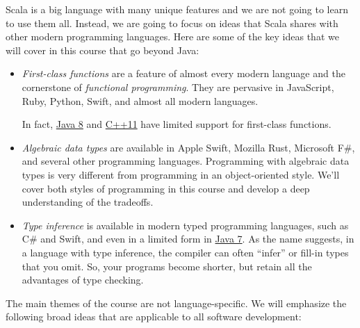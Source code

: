 \documentclass{book}
\begin{document}
Scala is a big language with many unique features and we are not going to learn
to use them all. Instead, we are going to focus on ideas that Scala shares with
other modern programming languages. Here are some of the key ideas that we will
cover in this course that go beyond Java:

\begin{itemize}

\item \emph{First-class functions} are a feature of almost every modern language
  and the cornerstone of \emph{functional programming}. They are pervasive in
  JavaScript, Ruby, Python, Swift, and almost all modern languages.

  In fact, \href{{http://docs.oracle.com/javase/tutorial/java/javaOO/lambdaexpressions.html}}{Java 8} and
  \href{http://msdn.microsoft.com/en-us/library/dd293608.aspx}{C++11}
  have limited support for first-class functions.

\item \emph{Algebraic data types} are available in Apple Swift, Mozilla Rust,
  Microsoft F\#, and several other programming languages. Programming with
  algebraic data types is very different from programming in an object-oriented
  style. We'll cover both styles of programming in this course and develop
  a deep understanding of the tradeoffs.

\item \emph{Type inference} is available in modern typed programming languages,
  such as C\# and Swift, and even in a limited form in
  \href{http://docs.oracle.com/javase/tutorial/java/generics/genTypeInference.html}{Java 7}.
  As the name suggests, in a language with type inference, the compiler can
  often ``infer'' or fill-in types that you omit. So, your programs become shorter, but
  retain all the advantages of type checking.

\end{itemize}

The main themes of the course are not language-specific. We will emphasize
the following broad ideas that are applicable to all software development:
\end{document}
